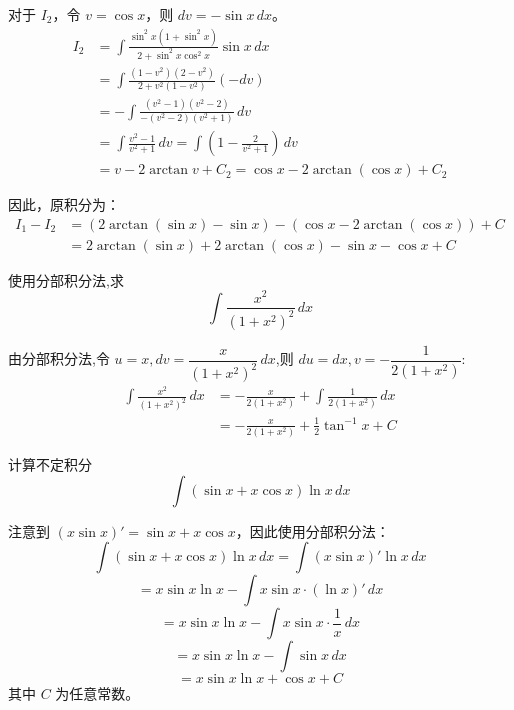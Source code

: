 \begin{questions}
\begin{solution}
对于 $I_2$，令 $v = \cos x$，则 $dv = -\sin x \,dx$。
\begin{align*}
I_2 &= \int \frac{\sin^2 x(1 + \sin^2 x)}{2 + \sin^2 x \cos^2 x} \sin x \,dx \\
&= \int \frac{(1 - v^2)(2 - v^2)}{2 + v^2(1 - v^2)} (-dv) \\
&= -\int \frac{(v^2 - 1)(v^2 - 2)}{-(v^2 - 2)(v^2 + 1)} \,dv \\
&= \int \frac{v^2 - 1}{v^2 + 1} \,dv = \int \left( 1 - \frac{2}{v^2 + 1} \right) \,dv \\
&= v - 2\arctan v + C_2 = \cos x - 2\arctan(\cos x) + C_2
\end{align*}

因此，原积分为：
\begin{align*}
I_1 - I_2 &= (2\arctan(\sin x) - \sin x) - (\cos x - 2\arctan(\cos x)) + C \\
&= 2\arctan(\sin x) + 2\arctan(\cos x) - \sin x - \cos x + C
\end{align*}
\end{solution}

    \question 使用分部积分法,求
    \[ 
    \int \frac{x^2}{(1+x^2)^2}\, dx 
    \]
    \begin{solution}
        由分部积分法,令 $u=x, dv = \dfrac{x}{(1+x^2)^2} \,dx$,则 $du = dx, v = -\dfrac{1}{2(1+x^2)}$:
        \begin{align*}
        \int \frac{x^2}{(1+x^2)^2} \,dx &= -\frac{x}{2(1+x^2)} + \int \frac{1}{2(1+x^2)} \,dx \\
        &= -\frac{x}{2(1+x^2)} + \frac{1}{2} \tan^{-1} x + C
        \end{align*}
    \end{solution}

    \question
计算不定积分
\[
\int (\sin x + x \cos x) \ln x \, dx
\]

\begin{solution}
注意到 $(x \sin x)' = \sin x + x \cos x$，因此使用分部积分法：
\[
\int (\sin x + x \cos x) \ln x \, dx = \int (x \sin x)' \ln x \, dx
\]
\[
= x \sin x \ln x - \int x \sin x \cdot \left(\ln x\right)' \, dx
\]
\[
= x \sin x \ln x - \int x \sin x \cdot \frac{1}{x} \, dx
\]
\[
= x \sin x \ln x - \int \sin x \, dx
\]
\[
= x \sin x \ln x + \cos x + C
\]
其中 $C$ 为任意常数。
\end{solution}


\end{questions}
